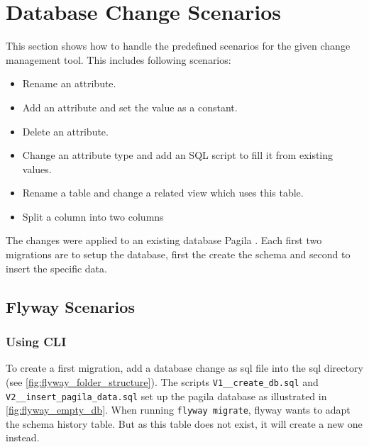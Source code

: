 

\chapter{Database Change Scenarios}
This section shows how to handle the predefined scenarios for the given change management tool. This includes following scenarios: 

\begin{itemize}
	\item Rename an attribute.
	\item Add an attribute and set the value as a constant.
	\item Delete an attribute.
	\item Change an attribute type and add an SQL script to fill it from existing values.
	\item Rename a table and change a related view which uses this table.
	\item Split a column into two columns
\end{itemize}

The changes were applied to an existing database Pagila \cite{Hillyer}. Each first two migrations are to setup the database, first the create the schema and second to insert the specific data.

\section{Flyway Scenarios}

\subsection{Using CLI}
%
To create a first migration, add a database change as sql file into the sql directory (see \autoref{fig:flyway_folder_structure}). 
The scripts \texttt{V1\_\_create\_db.sql} and \texttt{V2\_\_insert\_pagila\_data.sql} set up the pagila database as illustrated in \autoref{fig:flyway_empty_db}. When running  \texttt{flyway migrate}, flyway wants to adapt the schema history table. But as this table does not exist, it will create a new one instead.


 

